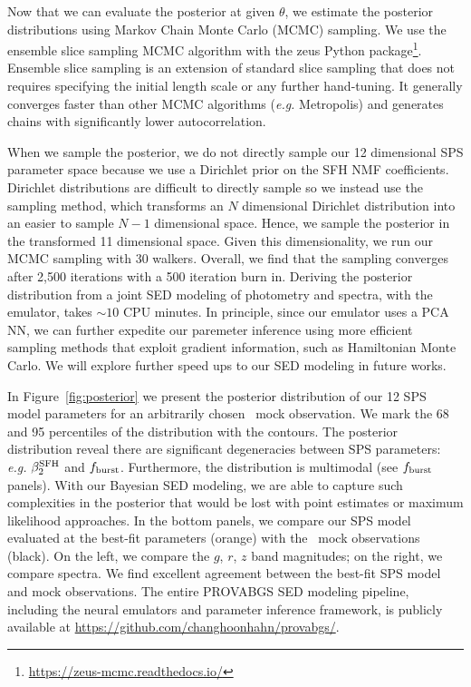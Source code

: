Now that we can evaluate the posterior at given $\theta$, we estimate the
posterior distributions using Markov Chain Monte Carlo (MCMC) sampling. 
We use the \cite{karamanis2020} ensemble slice sampling MCMC algorithm with the
{\sc zeus} Python
package\footnote{\href{https://zeus-mcmc.readthedocs.io/}{https://zeus-mcmc.readthedocs.io/}}. 
Ensemble slice sampling is an extension of standard slice sampling that does
not requires specifying the initial length scale or any further hand-tuning.
It generally converges faster than other MCMC algorithms (\emph{e.g.}
Metropolis) and generates chains with significantly lower autocorrelation.

When we sample the posterior, we do not directly sample our 12 dimensional
SPS parameter space because we use a Dirichlet prior on the SFH NMF
coefficients. 
Dirichlet distributions are difficult to directly sample so we instead use the
\cite{betancourt2012} sampling method, which transforms an $N$ dimensional
Dirichlet distribution into an easier to sample $N-1$ dimensional space.
Hence, we sample the posterior in the transformed 11 dimensional space. 
Given this dimensionality, we run our MCMC sampling with 30 walkers.
Overall, we find that the sampling converges after 2,500 iterations with a 500
iteration burn in. 
Deriving the posterior distribution from a joint SED modeling of photometry and
spectra, with the emulator, takes ${\sim}10$ CPU minutes. 
In principle, since our emulator uses a PCA NN, we can further expedite our
paremeter inference using more efficient sampling methods that exploit gradient
information, such as Hamiltonian Monte Carlo.  
We will explore further speed ups to our SED modeling in future works. 

In Figure~\ref{fig:posterior} we present the posterior distribution of our 12
SPS model parameters for an arbitrarily chosen \lgal~mock observation. 
We mark the 68 and 95 percentiles of the distribution with the contours. 
The posterior distribution reveal there are significant degeneracies between
SPS parameters: \emph{e.g.} $\beta_2^{\rm SFH}$ and $f_{\rm burst}$. 
Furthermore, the distribution is multimodal (see $f_{\rm burst}$ panels). 
With our Bayesian SED modeling, we are able to capture such complexities in the
posterior that would be lost with point estimates or maximum likelihood
approaches.
In the bottom panels, we compare our SPS model evaluated at the best-fit
parameters (orange) with the \lgal~mock observations (black). 
On the left, we compare the $g$, $r$, $z$ band magnitudes; on the right, we
compare spectra. 
We find excellent agreement between the best-fit SPS model and mock
observations.
The entire PROVABGS SED modeling pipeline, including the neural emulators and
parameter inference framework, is publicly available at
\href{https://github.com/changhoonhahn/provabgs/}{https://github.com/changhoonhahn/provabgs/}. 
